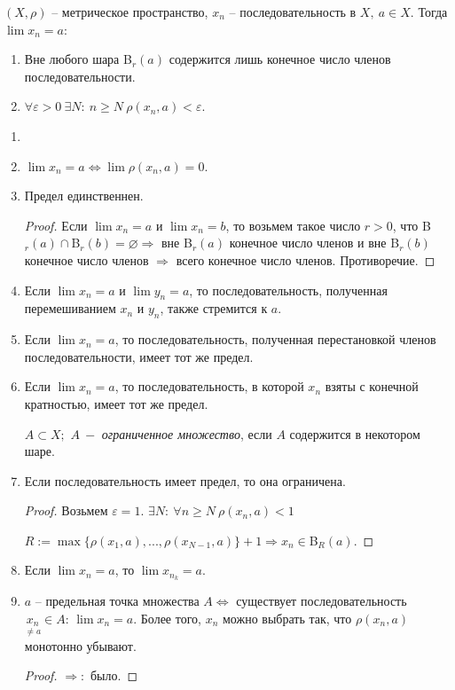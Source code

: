 \begin{definition}
    $(X, \rho)$ – метрическое пространство, $x_n$ – последовательность в $X,\ a\in X$. Тогда $\lim x_n = a$:
    \begin{enumerate}
        \item Вне любого шара B$_r(a)$ содержится лишь конечное число членов последовательности.
        \item $\forall \varepsilon > 0\ \exists N:\ n\geq N\ \rho(x_n, a)<\varepsilon$.
    \end{enumerate}
\end{definition}

\begin{statement}
    \begin{enumerate}
        \item[]
        \item $\lim x_n=a\Leftrightarrow \lim \rho(x_n, a)=0$.
        \item Предел единственнен.
        \begin{proof}
            Если $\lim x_n=a$ и $\lim x_n=b$, то возьмем такое число $r>0$, что B$_r(a) \cap $B$_r(b) = \varnothing\Rightarrow$ вне B$_r(a)$ конечное число членов и вне B$_r(b)$ конечное число членов $\Rightarrow$ всего конечное число членов. Противоречие.
        \end{proof}
        \item Если $\lim x_n=a$ и $\lim y_n=a$, то последовательность, полученная перемешиванием $x_n$ и $y_n$, также стремится к $a$.
        \item Если $\lim x_n=a$, то последовательность, полученная перестановкой членов последовательности, имеет тот же предел.
        \item Если $\lim x_n=a$, то последовательность, в которой $x_n$ взяты с конечной кратностью, имеет тот же предел.
    
        \begin{definition}
        $A\subset X;$ $A\ -$ \textit{ограниченное множество}, если $A$ содержится в некотором шаре.
        \end{definition}

        \item Если последовательность имеет предел, то она ограничена.
        \begin{proof}
            Возьмем $\varepsilon=1$. $\exists N:\ \forall n\geq N \ \rho(x_n, a)<1$

            $R:=\max\{\rho(x_1, a), ..., \rho(x_{N-1}, a)\}+1\Rightarrow x_n\in$B$_R(a)$.
        \end{proof}
        \item Если $\lim x_n=a$, то $\lim x_{n_k}=a$.
        \item $a$ – предельная точка множества $A\Leftrightarrow$ существует последовательность $\underset{\neq a}{x_n}\in A$: $\lim x_n=a$. Более того, $x_n$ можно выбрать так, что $\rho(x_n, a)$ монотонно убывают.
        \begin{proof}
            $\Rightarrow:$ было.


\end{proof}
\end{enumerate}
\end{statement}
